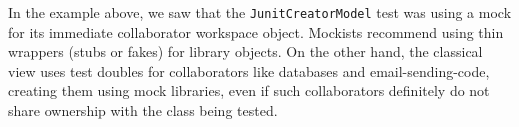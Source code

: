 In the example above, we saw that the
\texttt{JunitCreatorModel} test was using a mock for its immediate collaborator
workspace object. Mockists recommend using thin wrappers (stubs or fakes) for 
library objects. On the other hand, the classical view uses test doubles
for collaborators like databases and email-sending-code, creating them using mock libraries, even if such collaborators definitely
do not share ownership with the class being tested.




